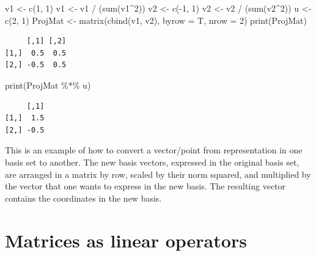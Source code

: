 \documentclass[
  letterpaper,
  DIV=11,
  numbers=noendperiod]{scrreprt}
\newenvironment{Shaded}{\begin{snugshade}}{\end{snugshade}}
\newcommand{\AttributeTok}[1]{\textcolor[rgb]{0.40,0.45,0.13}{#1}}
\newcommand{\DecValTok}[1]{\textcolor[rgb]{0.68,0.00,0.00}{#1}}
\newcommand{\FunctionTok}[1]{\textcolor[rgb]{0.28,0.35,0.67}{#1}}
\newcommand{\NormalTok}[1]{\textcolor[rgb]{0.00,0.23,0.31}{#1}}
\newcommand{\OtherTok}[1]{\textcolor[rgb]{0.00,0.23,0.31}{#1}}
\newcommand{\SpecialCharTok}[1]{\textcolor[rgb]{0.37,0.37,0.37}{#1}}
\begin{document}
\begin{Shaded}
\begin{Highlighting}[]
\NormalTok{v1 }\OtherTok{\textless{}{-}} \FunctionTok{c}\NormalTok{(}\DecValTok{1}\NormalTok{, }\DecValTok{1}\NormalTok{)}
\NormalTok{v1 }\OtherTok{\textless{}{-}}\NormalTok{ v1 }\SpecialCharTok{/}\NormalTok{ (}\FunctionTok{sum}\NormalTok{(v1}\SpecialCharTok{\^{}}\DecValTok{2}\NormalTok{))}
\NormalTok{v2 }\OtherTok{\textless{}{-}} \FunctionTok{c}\NormalTok{(}\SpecialCharTok{{-}}\DecValTok{1}\NormalTok{, }\DecValTok{1}\NormalTok{)}
\NormalTok{v2 }\OtherTok{\textless{}{-}}\NormalTok{ v2 }\SpecialCharTok{/}\NormalTok{ (}\FunctionTok{sum}\NormalTok{(v2}\SpecialCharTok{\^{}}\DecValTok{2}\NormalTok{))}
\NormalTok{u }\OtherTok{\textless{}{-}} \FunctionTok{c}\NormalTok{(}\DecValTok{2}\NormalTok{, }\DecValTok{1}\NormalTok{)}
\NormalTok{ProjMat }\OtherTok{\textless{}{-}} \FunctionTok{matrix}\NormalTok{(}\FunctionTok{cbind}\NormalTok{(v1, v2), }
                  \AttributeTok{byrow =}\NormalTok{ T, }\AttributeTok{nrow =} \DecValTok{2}\NormalTok{)}
\FunctionTok{print}\NormalTok{(ProjMat)}
\end{Highlighting}
\end{Shaded}

\begin{verbatim}
     [,1] [,2]
[1,]  0.5  0.5
[2,] -0.5  0.5
\end{verbatim}

\begin{Shaded}
\begin{Highlighting}[]
\FunctionTok{print}\NormalTok{(ProjMat }\SpecialCharTok{\%*\%}\NormalTok{ u)}
\end{Highlighting}
\end{Shaded}

\begin{verbatim}
     [,1]
[1,]  1.5
[2,] -0.5
\end{verbatim}

This is an example of how to convert a vector/point from representation
in one basis set to another. The new basis vectors, expressed in the
original basis set, are arranged in a matrix by row, scaled by their
norm squared, and multiplied by the vector that one wants to express in
the new basis. The resulting vector contains the coordinates in the new
basis.

\hypertarget{matrices-as-linear-operators}{%
\section{Matrices as linear
operators}\label{matrices-as-linear-operators}}
\end{document}
